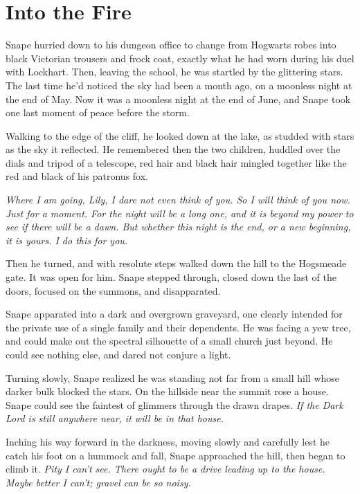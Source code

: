 
\chapter{Into the Fire}

Snape hurried down to his dungeon office to change from Hogwarts robes into black Victorian trousers and frock coat, exactly what he had worn during his duel with Lockhart. Then, leaving the school, he was startled by the glittering stars. The last time he'd noticed the sky had been a month ago, on a moonless night at the end of May. Now it was a moonless night at the end of June, and Snape took one last moment of peace before the storm.

Walking to the edge of the cliff, he looked down at the lake, as studded with stars as the sky it reflected. He remembered then the two children, huddled over the dials and tripod of a telescope, red hair and black hair mingled together like the red and black of his patronus fox.

\emph{Where I am going, Lily, I dare not even think of you. So I will think of you now. Just for a moment. For the night will be a long one, and it is beyond my power to see if there will be a dawn. But whether this night is the end, or a new beginning, it is yours. I do this for you.}

Then he turned, and with resolute steps walked down the hill to the Hogsmeade gate. It was open for him. Snape stepped through, closed down the last of the doors, focused on the summons, and disapparated.

\sbreak

Snape apparated into a dark and overgrown graveyard, one clearly intended for the private use of a single family and their dependents. He was facing a yew tree, and could make out the spectral silhouette of a small church just beyond. He could see nothing else, and dared not conjure a light.

Turning slowly, Snape realized he was standing not far from a small hill whose darker bulk blocked the stars. On the hillside near the summit rose a house. Snape could see the faintest of glimmers through the drawn drapes. \emph{If the Dark Lord is still anywhere near, it will be in that house.}

Inching his way forward in the darkness, moving slowly and carefully lest he catch his foot on a hummock and fall, Snape approached the hill, then began to climb it. \emph{Pity I can't see. There ought to be a drive leading up to the house. Maybe better I can't; gravel can be so noisy.}

